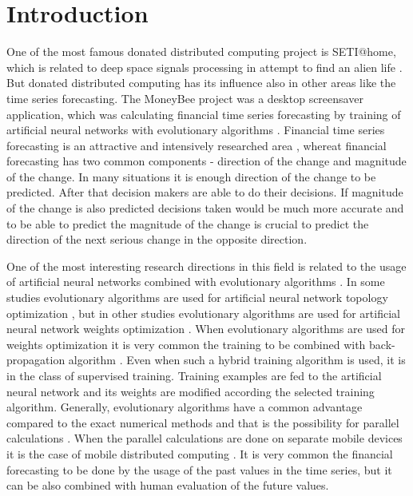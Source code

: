 \documentclass[runningheads]{llncs}
\begin{document}
\section{Introduction} \label{Introduction}

One of the most famous donated distributed computing project is SETI@home, which is related to deep space signals processing in attempt to find an alien life \cite{setihome01}. But donated distributed computing has its influence also in other areas like the time series forecasting. The MoneyBee project was a desktop screensaver application, which was calculating financial time series forecasting by training of artificial neural networks with evolutionary algorithms \cite{bohn01}. Financial time series forecasting is an attractive and intensively researched area \cite{nava01}, whereat financial forecasting has two common components - direction of the change and magnitude of the change.
In many situations it is enough direction of the change to be predicted. After that decision makers are able to do their decisions. If magnitude of the change is also predicted decisions taken would be much more accurate and to be able to predict the magnitude of the change is crucial to predict the direction of the next serious change in the opposite direction.

One of the most interesting research directions in this field is related to the usage of artificial neural networks combined with evolutionary algorithms \cite{zhang01}. In some studies evolutionary algorithms are used for artificial neural network topology optimization \cite{kapanova01}, but in other studies evolutionary algorithms are used for artificial neural network weights optimization \cite{aljarah01}. When evolutionary algorithms are used for weights optimization it is very common the training to be combined with back-propagation algorithm \cite{balabanov02}. Even when such a hybrid training algorithm is used, it is in the class of supervised training. Training examples are fed to the artificial neural network and its weights are modified according the selected training algorithm. Generally, evolutionary algorithms have a common advantage compared to the exact numerical methods and that is the possibility for parallel calculations \cite{altinoz01}. When the parallel calculations are done on separate mobile devices it is the case of mobile distributed computing \cite{sharma01}. It is very common the financial forecasting to be done by the usage of the past values in the time series, but it can be also combined with human evaluation of the future values.
\end{document}
